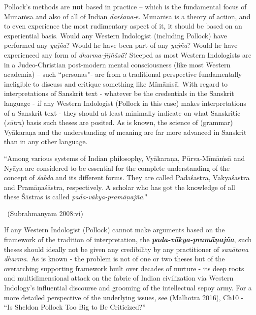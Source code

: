 Pollock’s methods are \textbf{not} based in practice – which is the fundamental focus of Mīmāṁsā and also of all of Indian \textit{darśana-}s. Mīmāṁsā is a theory of action, and to even experience the most rudimentary aspect of it, it should be based on an experiential basis. Would any Western Indologist (including Pollock) have performed any \textit{yajña}? Would he have been part of any \textit{yajña}? Would he have experienced any form of \textit{dharma-jijñāsā}? Steeped as most Western Indologists are in a Judeo-Christian post-modern mental consciousness (like most Western academia) – such “personas”- are from a traditional perspective fundamentally ineligible to discuss and critique something like Mīmāṁsā. With regard to interpretations of Sanskrit text - whatever be the credentials in the Sanskrit language - if any Western Indologist (Pollock in this case) makes interpretations of a Sanskrit text - they should at least minimally indicate on what Sanskritic (\textit{sūtra}) basis such theses are posited. As is known, the science of (grammar) Vyākaraṇa and the understanding of meaning are far more advanced in Sanskrit than in any other language.
\begin{myquote}
“Among various systems of Indian philosophy, Vyākaraṇa, Pūrva-Mīmāṁsā and Nyāya are considered to be essential for the complete understanding of the concept of \textit{śabda} and its different forms. They are called Padaśāstra, Vākyaśāstra and Pramāṇaśāstra, respectively. A scholar who has got the knowledge of all these Śāstras is called \textit{pada-vākya-pramāṇajña}."

\vskip -5pt

~\hfill (Subrahmanyam 2008:vi)
\end{myquote}

\vskip 3pt

If any Western Indologist (Pollock) cannot make arguments based on the framework of the tradition of interpretation, the \textit{\textbf{pada-vākya-pramāṇajña}}, such theses should ideally not be given any credibility by any practitioner of \textit{sanātana dharma.} As is known - the problem is not of one or two theses but of the overarching supporting framework built over decades of nurture - its deep roots and multidimensional attack on the fabric of Indian civilization via Western Indology’s influential discourse and grooming of the intellectual sepoy army. For a more detailed perspective of the underlying issues, see (Malhotra 2016), Ch10 - “Is Sheldon Pollock Too Big to Be Criticized?”

